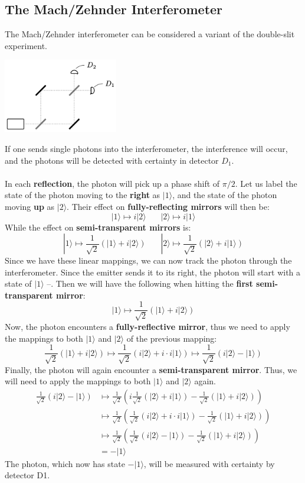 \documentclass{article}
\begin{document}
\subsection{The Mach/Zehnder Interferometer}
The Mach/Zehnder interferometer can be considered a variant of the double-slit experiment.

\begin{center}
	\includegraphics[width=5cm]{assets/interferometer.png}
\end{center}
If one sends single photons into the interferometer, the interference will occur, and the photons will be detected with certainty in detector $D_1$. \\ \\
In each \textbf{reflection}, the photon will pick up a phase shift of $\pi / 2$. Let us label the state of the photon moving to the \textbf{right} as $|1\rangle$, and the state of the photon moving \textbf{up} as $|2\rangle$. Their effect on \textbf{fully-reflecting mirrors} will then be:
\[ |1\rangle \mapsto i|2\rangle ~~~~~~~~ |2\rangle \mapsto i|1\rangle \]
While the effect on \textbf{semi-transparent mirrors} is:
\[ |1\rangle \mapsto \frac{1}{\sqrt{2}}(|1\rangle + i|2\rangle) ~~~~~~~~ |2\rangle \mapsto \frac{1}{\sqrt{2}}(|2\rangle + i|1\rangle) \]
Since we have these linear mappings, we can now track the photon through the interferometer. Since the emitter sends it to its right, the photon will start with a state of $|1\rangle$ --. Then we will have the following when hitting the \textbf{first semi-transparent mirror}:
\[ |1\rangle \mapsto \frac{1}{\sqrt{2}}(|1\rangle + i|2\rangle) \]
Now, the photon encounters a \textbf{fully-reflective mirror}, thus we need to apply the mappings to both $|1\rangle$ and $|2\rangle$ of the previous mapping:
\[ \frac{1}{\sqrt{2}}(|1\rangle + i|2\rangle) \mapsto \frac{1}{\sqrt{2}}(i|2\rangle + i \cdot i|1\rangle) \mapsto \frac{1}{\sqrt{2}}(i|2\rangle - |1\rangle) \]
Finally, the photon will again encounter a \textbf{semi-transparent mirror}. Thus, we will need to apply the mappings to both $|1\rangle$ and $|2\rangle$ again.
\begin{align*}
	\frac{1}{\sqrt{2}}(i|2\rangle - |1\rangle) &\mapsto \frac{1}{\sqrt{2}}\left(i\frac{1}{\sqrt{2}}(|2\rangle + i|1\rangle) - \frac{1}{\sqrt{2}}(|1\rangle + i|2\rangle) \right) \\
	&\mapsto \frac{1}{\sqrt{2}} \left( \frac{1}{\sqrt{2}}(i|2\rangle + i \cdot i|1\rangle) - \frac{1}{\sqrt{2}}(|1\rangle + i|2\rangle) \right) \\
	&\mapsto \frac{1}{\sqrt{2}} \left( \frac{1}{\sqrt{2}}(i|2\rangle - |1\rangle) - \frac{1}{\sqrt{2}}(|1\rangle + i|2\rangle) \right) \\
	&= -|1\rangle
\end{align*}
The photon, which now has state $-|1\rangle$, will be measured with certainty by detector D1.
\end{document}
